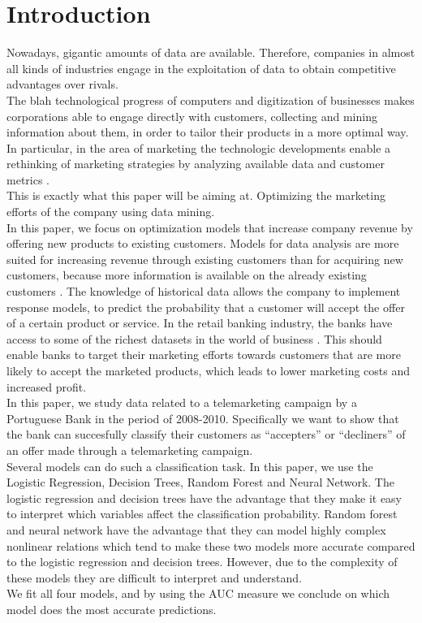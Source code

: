     \section{Introduction}
\noindent Nowadays, gigantic amounts of data are available. Therefore, companies in almost all kinds of industries engage in the exploitation of data to obtain competitive advantages over rivals\citep{provost2013data}.\\
The blah technological progress of computers and digitization of businesses makes corporations able to engage directly with customers, collecting and mining information about them, in order to tailor their products in a more optimal way\citep{rust2010rethinking}.\\ 
[\baselineskip]\indent
In particular, in the area of marketing the technologic developments enable a rethinking of marketing strategies by analyzing available data and customer metrics \citep{moro2014data}. \\
This is exactly what this paper will be aiming at. Optimizing the marketing efforts of the company using data mining.\\
In this paper, we focus on optimization models that increase company revenue by offering new products to existing customers. Models for data analysis are more suited for increasing revenue through existing customers than for acquiring new customers, because more information is available on the already existing customers \citep{nobibon2011optimization}. The knowledge of historical data allows the company to implement response models, to predict the probability that a customer will accept the offer of a certain product or service. In the retail banking industry, the banks have access to some of the richest datasets in the world of business \citep{nobibon2011optimization}. This should enable banks to target their marketing efforts towards customers that are more likely to accept the marketed products, which leads to lower marketing costs and increased profit.\\
In this paper, we study data related to a telemarketing campaign by a Portuguese Bank in the period of 2008-2010. Specifically we want to show that the bank can succesfully classify their customers as “accepters” or “decliners” of an offer made through a telemarketing campaign.\\
Several models can do such a classification task. In this paper, we use the Logistic Regression, Decision Trees, Random Forest and Neural Network.
The logistic regression and decision trees have the advantage that they make it easy to interpret which variables affect the classification probability. Random forest and neural network have the advantage that they can model highly complex nonlinear relations which tend to make these two models more accurate compared to the logistic regression and decision trees. However, due to the complexity of these models they are difficult to interpret and understand.\\
We fit all four models, and by using the AUC measure we conclude on which model does the most accurate predictions.
    \newpage
    \pagestyle{fancy}
